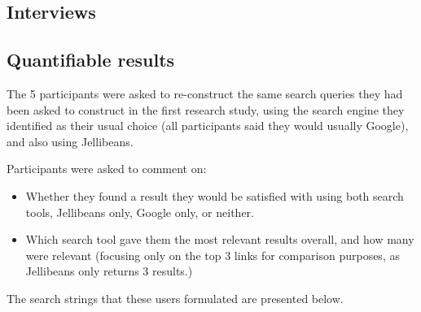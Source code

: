 \documentclass[a4paper, 11pt]{article}
\begin{document}
\subsection{Interviews}
\subsection{Quantifiable results}
The 5 participants were asked to re-construct the same search queries they had been asked to construct in the first research study, using the search engine they identified as their usual choice (all participants said they would usually Google), and also using Jellibeans. 

\vspace{5mm}
Participants were asked to comment on:
\begin{itemize}
\item{Whether they found a result they would be satisfied with using both search tools, Jellibeans only, Google only, or neither.}
\item{Which search tool gave them the most relevant results overall, and how many were relevant (focusing only on the top 3 links for comparison purposes, as Jellibeans only returns 3 results.)}
\end{itemize}

\vspace{5mm}
The search strings that these users formulated are presented below.
\end{document}
